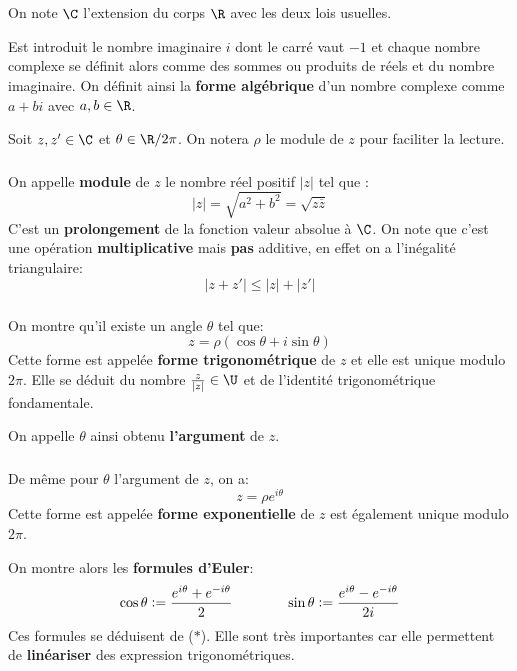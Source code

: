 \chapter*{}
On note \(\C\) l'extension du corps \(\R\) avec les deux lois usuelles. \< 

Est introduit le nombre imaginaire \(i\) dont le carré vaut \(-1\) et chaque nombre complexe se définit alors comme des sommes ou produits de réels et du nombre imaginaire.\+
On définit ainsi la \textbf{forme algébrique} d'un nombre complexe comme \(a + bi\) avec \(a, b \in \R\). \<

Soit \(z, z' \in \C\) et \(\theta \in \R/2\pi\). On notera \(\rho\) le module de \(z\) pour faciliter la lecture.

\subsection*{}
On appelle \textbf{module} de \(z\) le nombre réel positif \(|z|\) tel que {:}
\[
    \boxed{
        |z| = \sqrt{a^2 + b^2} = \sqrt{z\overline{z}} 
    }
\]
C'est un \textbf{prolongement} de la fonction valeur absolue à \(\C\).
On note que c'est une opération \textbf{multiplicative} mais \textbf{pas} additive, en effet on a l'inégalité triangulaire:
\[
   |z + z'| \leq |z| + |z'|   
\]
\subsection*{}
On montre qu'il existe un angle \(\theta\) tel que:
\[
    \boxed{
       z = \rho(\cos\theta+i\sin\theta)   
    }
\]
Cette forme est appelée \textbf{forme trigonométrique} de \(z\) et elle est unique modulo \(2\pi\).\+
Elle se déduit du nombre \(\frac{z}{|z|} \in \U\) et de l'identité trigonométrique fondamentale.\<

On appelle \(\theta\) ainsi obtenu \textbf{l'argument} de \(z\).
\subsection*{}
De même pour \(\theta\) l'argument de \(z\), on a:
\[
    \boxed{
        z = \rho e^{i\theta} 
    }
\]
Cette forme est appelée \textbf{forme exponentielle} de \(z\) est également unique modulo \(2\pi\).\<

On montre alors les \textbf{formules d'Euler}:
\[
  \begin{aligned}
     \cos\theta := \frac{e^{i\theta}+e^{-i\theta}}{2}
  \end{aligned}
  \hspace*{40pt}
  \begin{aligned}
     \sin\theta := \frac{e^{i\theta}-e^{-i\theta}}{2i}
  \end{aligned}
\]
Ces formules se déduisent de (\(\ast\)). Elle sont très importantes car elle permettent de \textbf{linéariser} des expression trigonométriques.\<

